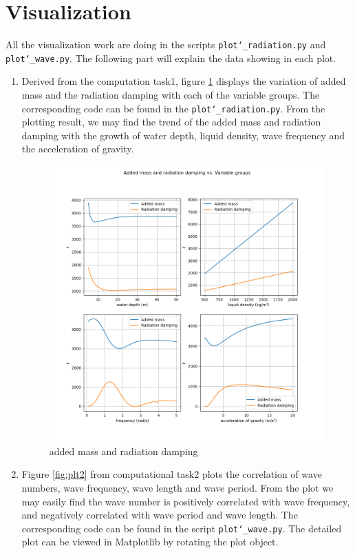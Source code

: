 \documentclass{article}
\begin{document}
\section{Visualization}
All the visualization work are doing in the scripts \texttt{plot\char`_radiation.py} and \texttt{plot\char`_wave.py}. The following part will explain the data showing in each plot.
\begin{enumerate}
    \item Derived from the computation task1, figure \ref{fig:plt1} displays the variation of added mass and the radiation damping with each of the variable groups. The corresponding code can be found in the \texttt{plot\char`_radiation.py}. From the plotting result, we may find the trend of the added mass and radiation damping with the growth of water depth, liquid density, wave frequency and the acceleration of gravity.
    \begin{figure}[h]
        \centering
        \includegraphics[width=1\textwidth]{img/1_radiation.png}
        \caption{added mass and radiation damping}
        \label{fig:plt1}
    \end{figure}
    \item Figure \ref{fig:plt2} from computational task2 plots the correlation of wave numbers, wave frequency, wave length and wave period. From the plot we may easily find the wave number is positively correlated with wave frequency, and negatively correlated with wave period and wave length. The corresponding code can be found in the script \texttt{plot\char`_wave.py}. The detailed plot can be viewed in Matplotlib by rotating the plot object.

\end{enumerate}
\end{document}
